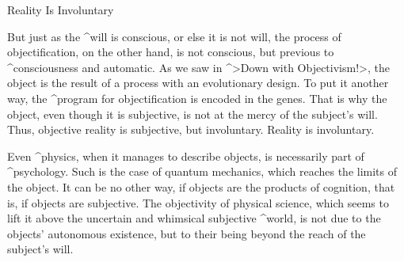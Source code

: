 \Section Reality Is Involuntary

But just as the ^{will} is conscious, or else it is not will, the
process of objectification, on the other hand, is not conscious, but
previous to ^{consciousness} and automatic. As we saw in ^>Down with
Objectivism!>,  the object is the result of a process with an
evolutionary design. To put it another way, the ^{program} for
objectification is encoded in the genes. That is why the object, even
though it is subjective, is not at the mercy of the subject's will.
Thus, objective reality is subjective, but involuntary. Reality is
involuntary.


Even ^{physics}, when it manages to describe objects, is necessarily
part of ^{psychology}. Such is the case of quantum mechanics, which
reaches the limits of the object. It can be no other way, if objects are
the products of cognition, that is, if objects are subjective. The
objectivity of physical science, which seems to lift it above the
uncertain and whimsical subjective ^{world}, is not due to the objects'
autonomous existence, but to their being beyond the reach of the
subject's will.

\endinput
